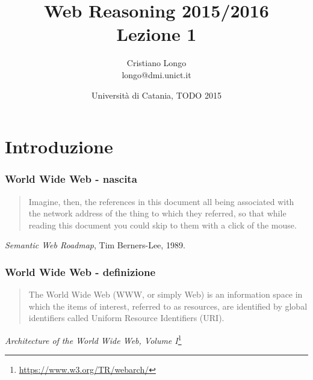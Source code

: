 \documentclass[8pt]{beamer}
\title{Web Reasoning 2015/2016\\
Lezione 1}
\author{Cristiano Longo\\ 
{\small{longo@dmi.unict.it}}}
\date{Universit\`a di Catania, TODO 2015}
\begin{document}
\maketitle
\setcounter{tocdepth}{1}

\section{Introduzione}

\begin{frame}
\frametitle{World Wide Web - nascita}
\begin{quote}
Imagine, then, the references in this document all being associated with 
the network address of the thing to which they referred, so that while 
reading this document you could skip to them with a click of the mouse.
\end{quote}
\vspace{\baselineskip}
\emph{Semantic Web Roadmap}, Tim Berners-Lee, 1989.
\vspace{\baselineskip}

\end{frame}

\begin{frame}
\frametitle{World Wide Web - definizione}
\begin{quote}
The World Wide Web (WWW, or simply Web) is an information space in which
the items of interest, referred to as resources, are identified by global
identifiers called Uniform Resource Identifiers (URI).
\end{quote}
\vspace{\baselineskip}
\emph{Architecture of the World Wide Web, Volume
I}\footnote{\url{https://www.w3.org/TR/webarch/}}
\vspace{\baselineskip}

\end{frame}
\end{document}
